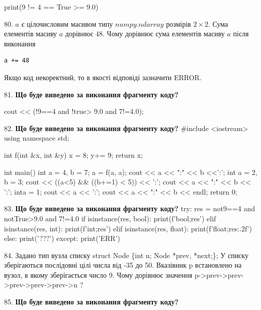 \documentclass[11pt]{article}
\begin{document}
print(9 != 4 == True >= 9.0)
\par\vspace{5mm}
80. 
$a$ є цілочисловим масивом типу $numpy.ndarray$ розмірів $2{\times}2$. Сума елементів масиву $a$ дорівнює 48. Чому дорівнює сума елементів масиву $a$ після виконання 
\begin{verbatim}
a += 48
\end{verbatim}


Якщо код некоректний, то в якості відповіді зазначити ERROR.


\par\vspace{5mm}
81. \textbf{Що буде виведено за виконання фрагменту коду?}

cout << (!9==4 and !true> 9.0 and 7!=4.0);
\par\vspace{5mm}
82. \textbf{Що буде виведено за виконання фрагменту коду?}
#include <iostream>
using namespace std;

int f(int &x, int &y){
    x = 8;
    y+= 9;
    return x;
}

int main(){
    int a = 4, b = 7;
    a = f(a, a);
    cout << a << ":" << b <<':';
    {
        int a = 2, b = 3;
        cout << ((a<5) && ((b+=1) < 5)) << ':';
        cout << a << ":" << b << ':';
    }
    {
        inta = 1;
        cout << a << ':';
    }
    cout << a << ":" << b << endl;
    return 0;
}

\par\vspace{5mm}
83. \textbf{Що буде виведено за виконання фрагменту коду?}
try:
    res = not9==4 and notTrue>9.0 and 7!=4.0
    if isinstance(res, bool):
        print(f'bool;{res}')
    elif isinstance(res, int):
        print(f'int;{res}')
    elif isinstance(res, float):
        print(f'float;{res:.2f}')
    else:
        print('???')
except:
    print('ERR')
\par\vspace{5mm}
84. 
Задано тип вузла списку
struct Node \{int n; Node *prev, *next;\};
У списку зберігаються послідовні цілі числа від -35 до 50. Вказівник p встановлено на вузол, в якому зберігається число 9.
Чому дорівнює значення p->prev->prev->prev->prev->prev->n ?\par\vspace{5mm}
85. \textbf{Що буде виведено за виконання фрагменту коду?}
\end{document}
